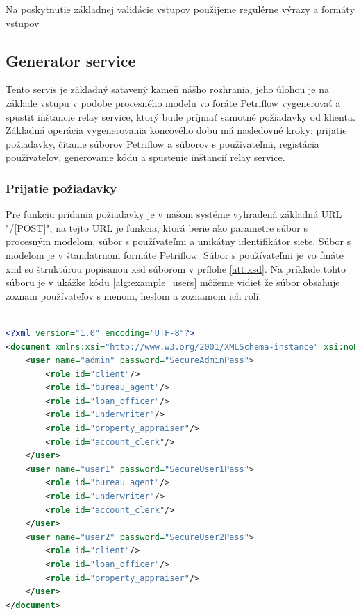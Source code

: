 Na poskytnutie základnej validácie vstupov použijeme regulérne výrazy a formáty vstupov


  

\subsection{Generator service} 
Tento servis je základný satavený kameň nášho rozhrania, jeho úlohou je na základe vstupu v podobe procesného modelu vo foráte Petriflow vygenerovať a spustit inštancie relay service, ktorý bude príjmať samotné požiadavky od klienta. Základná operácia vygenerovania koncového dobu má nasledovné kroky: 
prijatie požiadavky, 
čítanie súborov Petriflow a súborov s používateľmi, 
registácia používateľov,
generovanie kódu 
a spustenie inštancií relay service.

\subsubsection{Prijatie požiadavky}
Pre funkciu pridania požiadavky je v našom systéme vyhradená základná URL "/[POST]", na tejto URL je funkcia, ktorá berie ako parametre súbor s procesným modelom, súbor s používateľmi a unikátny identifikátor siete. Súbor s modelom je v štandatrnom formáte Petriflow. Súbor s používateľmi je vo fmáte \acrshort{xml} so štruktúrou popísanou \acrshort{xsd} súborom v prílohe \ref{att:xsd}. Na príklade tohto súboru je v ukážke kódu \ref{alg:example_users} môžeme vidieť že súbor obsahuje zoznam používateľov s menom, heslom a zoznamom ich rolí.  




\begin{lstlisting}[caption={Príklad súboru s používateľmi},label={alg:example_users},language=XML]

<?xml version="1.0" encoding="UTF-8"?>
<document xmlns:xsi="http://www.w3.org/2001/XMLSchema-instance" xsi:noNamespaceSchemaLocation="./users_schema.xsd">
	<user name="admin" password="SecureAdminPass">
		<role id="client"/>
		<role id="bureau_agent"/>
		<role id="loan_officer"/>
		<role id="underwriter"/>
		<role id="property_appraiser"/>
		<role id="account_clerk"/>
	</user>
	<user name="user1" password="SecureUser1Pass">
		<role id="bureau_agent"/>
		<role id="underwriter"/>
		<role id="account_clerk"/>
	</user>
	<user name="user2" password="SecureUser2Pass">
		<role id="client"/>
		<role id="loan_officer"/>
		<role id="property_appraiser"/>
	</user>
</document>
\end{lstlisting}


